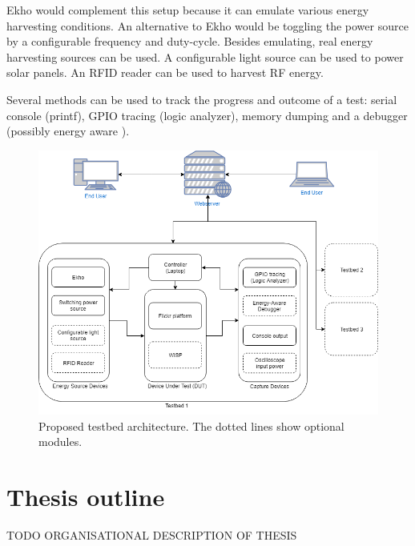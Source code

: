 Ekho \cite{ekho} would complement this setup because it can emulate various energy harvesting conditions. An alternative to Ekho would be toggling the power source by a configurable frequency and duty-cycle. Besides emulating, real energy harvesting sources can be used. A configurable light source can be used to power solar panels. An RFID reader can be used to harvest RF energy. 

Several methods can be used to track the progress and outcome of a test: serial console (printf), GPIO tracing (logic analyzer), memory dumping and a debugger (possibly energy aware \cite{edb}).

\begin{figure}[htb]
	\includegraphics[width=\textwidth]{pics/TestbedArchitecture_v3}
	\caption{Proposed testbed architecture. The dotted lines show optional modules.}
	\label{fig:architecture}
\end{figure}

\section{Thesis outline}

\vspace{1\baselineskip}

\noindent
TODO ORGANISATIONAL DESCRIPTION OF THESIS

